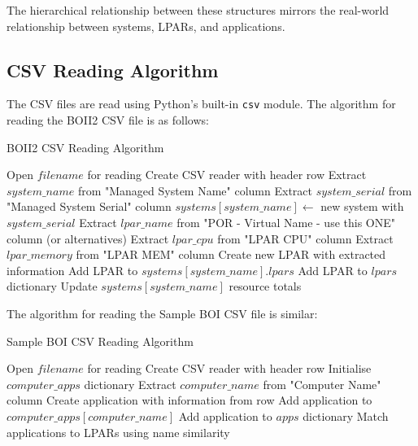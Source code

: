 \documentclass[a4paper,12pt]{article}
\begin{document}
The hierarchical relationship between these structures mirrors the real-world relationship between systems, LPARs, and applications.

\subsection{CSV Reading Algorithm}

The CSV files are read using Python's built-in \texttt{csv} module. The algorithm for reading the BOII2 CSV file is as follows:

\begin{algorithm}
\caption{BOII2 CSV Reading Algorithm}
\begin{algorithmic}[1]
    \State Open $filename$ for reading
    \State Create CSV reader with header row
        \State Extract $system\_name$ from "Managed System Name" column
        \State Extract $system\_serial$ from "Managed System Serial" column
            \State $systems[system\_name] \gets$ new system with $system\_serial$
        \EndIf
        \State Extract $lpar\_name$ from "POR - Virtual Name - use this ONE" column (or alternatives)
        \State Extract $lpar\_cpu$ from "LPAR CPU" column
        \State Extract $lpar\_memory$ from "LPAR MEM" column
        \State Create new LPAR with extracted information
        \State Add LPAR to $systems[system\_name].lpars$
        \State Add LPAR to $lpars$ dictionary
        \State Update $systems[system\_name]$ resource totals
    \EndFor
\EndProcedure
\end{algorithmic}
\end{algorithm}

The algorithm for reading the Sample BOI CSV file is similar:

\begin{algorithm}
\caption{Sample BOI CSV Reading Algorithm}
\begin{algorithmic}[1]
    \State Open $filename$ for reading
    \State Create CSV reader with header row
    \State Initialise $computer\_apps$ dictionary
        \State Extract $computer\_name$ from "Computer Name" column
        \State Create application with information from row
        \State Add application to $computer\_apps[computer\_name]$
        \State Add application to $apps$ dictionary
    \EndFor
    \State Match applications to LPARs using name similarity
\EndProcedure
\end{algorithmic}
\end{algorithm}
\end{document}
